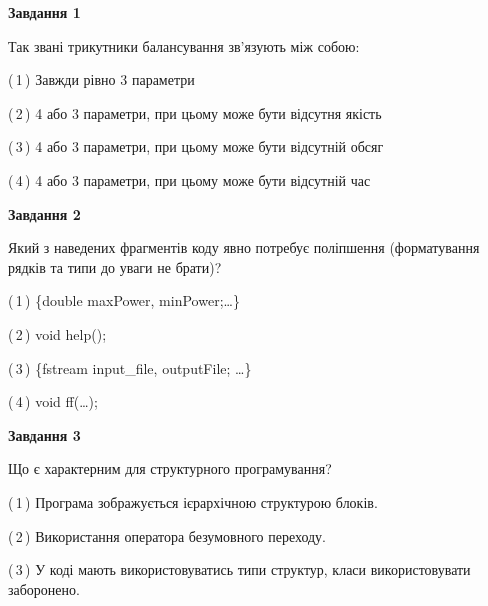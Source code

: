 \documentclass[10pt, ukrainian]{article}
\begin{document}
{
\begin {large}
{\begin {center}\textbf{Завдання 1}\end {center}}\par
Так звані трикутники балансування зв'язують між собою:\par
\vspace{2mm}



(\,1\,) Завжди рівно 3 параметри%



(\,2\,) 4 або 3 параметри, при цьому може бути відсутня якість%



(\,3\,) 4 або 3 параметри, при цьому може бути відсутній обсяг %



(\,4\,) 4 або 3 параметри, при цьому може бути відсутній час%


{\begin {center}\textbf{Завдання 2}\end {center}}\par
Який з наведених фрагментів коду явно потребує поліпшення (форматування рядків та типи до уваги не брати)?\par
\vspace{2mm}



(\,1\,) \{double maxPower, minPower;…\} %



(\,2\,) void help();%



(\,3\,) \{fstream input\_file, outputFile; …\}%



(\,4\,) void ff(…);%


{\begin {center}\textbf{Завдання 3}\end {center}}\par
Що є характерним для структурного програмування?\par
\vspace{2mm}



(\,1\,) Програма зображується ієрархічною структурою блоків.%



(\,2\,) Використання оператора безумовного переходу. %



(\,3\,) У коді мають використовуватись типи структур, класи використовувати заборонено. %




\end{large}}
\end{document}
